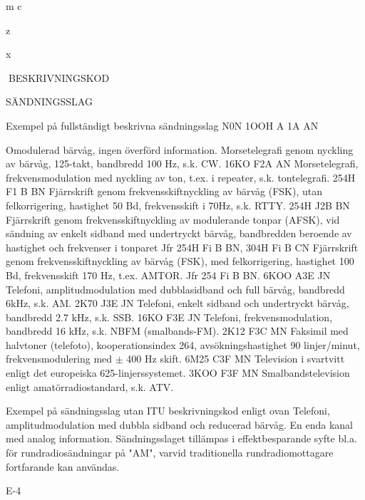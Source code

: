 m
c

z

x

BESKRIVNINGSKOD

SÄNDNINGSSLAG

Exempel på fullständigt beskrivna sändningsslag
N0N
1OOH A 1A AN

Omodulerad bärvåg, ingen överförd information.
Morsetelegrafi genom nyckling av bärvåg, 125-takt, bandbredd 100 Hz, s.k. CW.
16KO F2A AN Morsetelegrafi, frekvensmodulation med nyckling av ton,
t.ex. i repeater, s.k. tontelegrafi.
254H F1 B BN Fjärrskrift genom frekvensskiftnyckling av bärvåg (FSK),
utan felkorrigering, hastighet 50 Bd, frekvensskift i 70Hz,
s.k. RTTY.
254H J2B BN Fjärrskrift genom frekvensskiftnyckling av modulerande
tonpar (AFSK), vid sändning av enkelt sidband med undertryckt bärvåg, bandbredden beroende av hastighet och
frekvenser i tonparet
Jfr 254H Fi B BN,
304H Fi B CN Fjärrskrift genom frekvensskiftnyckling av bärvåg (FSK),
med felkorrigering, hastighet 100 Bd, frekvensskift 170
Hz, t.ex. AMTOR. Jfr 254 Fi B BN.
6KOO A3E JN Telefoni, amplitudmodulation med dubblasidband och full
bärvåg, bandbredd 6kHz, s.k. AM.
2K70 J3E JN Telefoni, enkelt sidband och undertryckt bärvåg, bandbredd 2.7 kHz, s.k. SSB.
16KO F3E JN
Telefoni, frekvensmodulation, bandbredd 16 kHz, s.k.
NBFM (smalbands-FM).
2K12 F3C MN Faksimil med halvtoner (telefoto), kooperationsindex 264,
avsökningshastighet 90 linjer/minut, frekvensmodulering
med \(\pm\) 400 Hz skift.
6M25 C3F MN Television i svartvitt enligt det europeiska 625-linjerssystemet.
3KOO F3F MN Smalbandstelevision enligt amatörradiostandard, s.k. ATV.

Exempel på sändningsslag utan ITU beskrivningskod enligt ovan
Telefoni, amplitudmodulation med dubbla sidband och
reducerad bärvåg.
En enda kanal med analog information.
Sändningsslaget tillämpas i effektbesparande syfte bl.a.
för rundradiosändningar på "AM", varvid traditionella
rundradiomottagare fortfarande kan användas.

E-4
